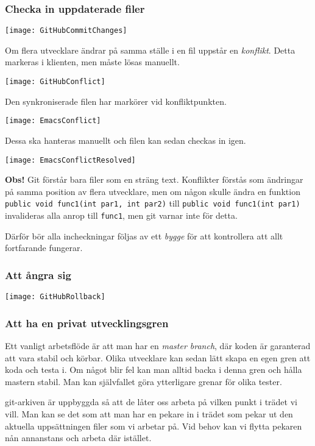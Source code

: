 \documentclass[swedish]{beamer}
\begin{document}
\begin{frame}
\frametitle{Checka in uppdaterade filer}
\texttt{[image: GitHubCommitChanges]}
\end{frame}

\begin{frame}
Om flera utvecklare ändrar på samma ställe i en fil uppstår en
\emph{konflikt}.  Detta markeras i klienten, men måste lösas manuellt.

\texttt{[image: GitHubConflict]}
\end{frame}

\begin{frame}
Den synkroniserade filen har markörer vid konfliktpunkten.

\texttt{[image: EmacsConflict]}
\end{frame}


\begin{frame}
Dessa ska hanteras manuellt och filen kan sedan checkas in igen.

\texttt{[image: EmacsConflictResolved]}
\end{frame}

\begin{frame}[fragile]
\textbf{Obs!}
Git förstår bara filer som en sträng text.
Konflikter förstås som ändringar på samma position av flera utvecklare, men om någon skulle ändra
en funktion \lstinline+public void func1(int par1, int par2)+ till \lstinline+public void func1(int par1)+ invalideras alla anrop till \lstinline+func1+, men
git varnar inte för detta.

Därför bör alla incheckningar följas av ett \emph{bygge} för att
kontrollera att allt fortfarande fungerar.
\end{frame}

\begin{frame}
  \frametitle{Att ångra sig}
  \texttt{[image: GitHubRollback]}
\end{frame}

\begin{frame}
\frametitle{Att ha en privat utvecklingsgren}
Ett vanligt arbetsflöde är att man har en \emph{master branch}, där koden är garanterad att vara stabil och körbar.  Olika utvecklare kan sedan lätt skapa en egen gren att koda och testa i.  Om något blir fel kan man alltid backa i denna gren och hålla mastern stabil.  Man kan självfallet göra ytterligare grenar för olika tester.

git-arkiven är uppbyggda så att de låter oss arbeta på vilken punkt i trädet vi vill.  Man kan se det som att man har en pekare in i trädet som pekar ut den aktuella uppsättningen filer som vi arbetar på.  Vid behov kan vi flytta pekaren nån annanstans och arbeta där istället.
\end{frame}
\end{document}
